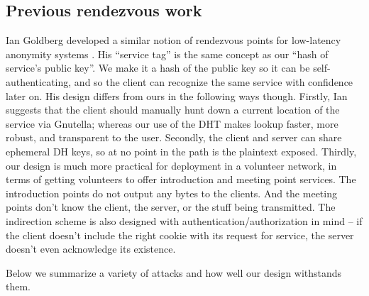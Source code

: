 \documentclass[times,10pt,twocolumn]{article}
\begin{document}
\subsection{Previous rendezvous work}

Ian Goldberg developed a similar notion of rendezvous points for
low-latency anonymity systems \cite{ian-thesis}. His ``service tag''
is the same concept as our ``hash of service's public key''. We make it
a hash of the public key so it can be self-authenticating, and so the
client can recognize the same service with confidence later on. His
design differs from ours in the following ways though. Firstly, Ian
suggests that the client should manually hunt down a current location of
the service via Gnutella; whereas our use of the DHT makes lookup faster,
more robust, and transparent to the user. Secondly, the client and server
can share ephemeral DH keys, so at no point in the path is the plaintext
exposed. Thirdly, our design is much more practical for deployment in a
volunteer network, in terms of getting volunteers to offer introduction
and meeting point services. The introduction points do not output any
bytes to the clients. And the meeting points don't know the client,
the server, or the stuff being transmitted. The indirection scheme
is also designed with authentication/authorization in mind -- if the
client doesn't include the right cookie with its request for service,
the server doesn't even acknowledge its existence.

\label{sec:maintaining-anonymity}

\label{subsec:many-messages}


\label{sec:attacks}

Below we summarize a variety of attacks and how well our design withstands
them.
\end{document}
